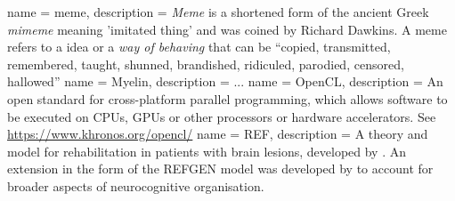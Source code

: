  {
name = meme,
description = {\textit{Meme} is a shortened form of the ancient Greek \textit{mimeme} meaning
'imitated thing' and was coined by Richard Dawkins. A meme refers to a idea or a
\textit{way of behaving} that can be \enquote{copied, transmitted, remembered, taught, shunned,
brandished, ridiculed, parodied, censored, hallowed} \autocite{dennett2017}}
}
 {
  name = Myelin,
  description = {...}
}
 {
   name = {OpenCL},
   description = {An open standard for cross-platform parallel programming, which
   allows software to be executed on CPUs, GPUs or other processors or hardware accelerators. See \url{
   https://www.khronos.org/opencl/}}
}
 {
  name = REF,
  description = {A theory and model for rehabilitation in patients
  with brain lesions, developed by \cite{Mogensen2011}.
  An extension in the form of the REFGEN model was developed by
  \textcite{Mogensen2017} to account for broader aspects of
  neurocognitive organisation.}
}
